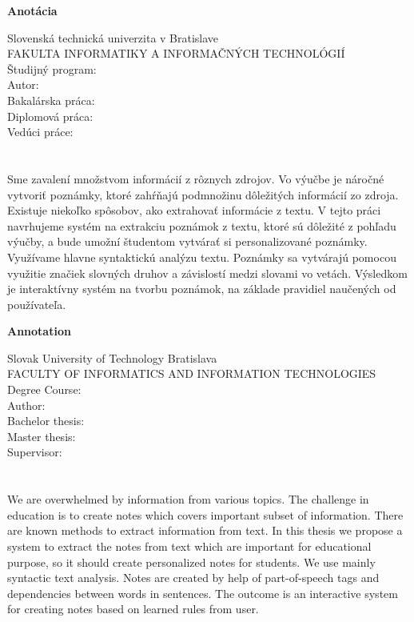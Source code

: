 \newpage
\thispagestyle{plain}
\begin{center}
\begin{Large}
\textbf{Anotácia} \\
\end{Large}
\end{center}
Slovenská technická univerzita v Bratislave \\
FAKULTA INFORMATIKY A INFORMAČNÝCH TECHNOLÓGIÍ \\
\noindent
Študijný program: \Program \\
\noindent
Autor: \Author \\
{
	{Bakalárska práca: }\Title \\
}
{
	{Diplomová práca: }\Title \\
}
Vedúci práce: \Supervisor \\
\Month \Year \\
\noindent
\\
Sme zavalení množstvom informácií z rôznych zdrojov. Vo výučbe je náročné vytvoriť poznámky, ktoré zahŕňajú podmnožinu dôležitých informácií zo zdroja. Existuje niekoľko spôsobov, ako extrahovať informácie z textu. V tejto práci navrhujeme systém na extrakciu poznámok z textu, ktoré sú dôležité z pohľadu výučby, a bude umožní študentom vytvárať si personalizované poznámky. Využívame hlavne syntaktickú analýzu textu. Poznámky sa vytvárajú pomocou využitie značiek slovných druhov a závislostí medzi slovami vo vetách. Výsledkom je interaktívny systém na tvorbu poznámok, na základe pravidiel naučených od používateľa.
\newpage
\thispagestyle{plain}
\begin{center}
\begin{Large}
\textbf{Annotation} \\
\end{Large}
\end{center}
Slovak University of Technology Bratislava \\
FACULTY OF INFORMATICS AND INFORMATION TECHNOLOGIES \\
\noindent
Degree Course: \Program \\
\noindent
Author: \Author \\
{
	{Bachelor thesis: }\Title \\
}
{
	{Master thesis: }\Title \\
}
Supervisor: \Supervisor \\
\Month \Year \\
\noindent
\\
We are overwhelmed by information from various topics. The challenge in education is to create notes which covers important subset of information. There are known methods to extract information from text. In this
thesis we propose a system to extract the notes from text which are important for educational purpose, so it should create personalized notes for students. We use mainly syntactic text analysis. Notes are created by help of part-of-speech tags and dependencies between words in sentences. The outcome is an interactive system for creating notes based on learned rules from user.